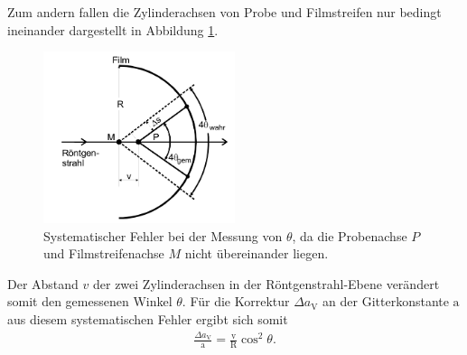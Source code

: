 Zum andern fallen die Zylinderachsen von Probe und Filmstreifen
nur bedingt ineinander dargestellt in Abbildung \ref{fig:error2}.

\begin{figure}
  \centering
  \includegraphics[width=0.5\textwidth]{Syst_error_2.PNG}
  \caption{Systematischer Fehler bei
  der Messung von $\theta$, da die Probenachse $P$
   und Filmstreifenachse $M$ nicht übereinander liegen.}
  \label{fig:error2}
\end{figure}
Der Abstand $v$ der zwei Zylinderachsen in der Röntgenstrahl-Ebene
verändert somit den gemessenen Winkel $\theta$.
Für die Korrektur $\Delta a_\mathrm{V}$ an der Gitterkonstante $\mathrm{a}$
aus diesem systematischen Fehler ergibt sich somit
\begin{align}
  \frac{\Delta a_\mathrm{V}}{\mathrm{a}}=\frac{\mathrm{v}}{\mathrm{R}} \cos^2 \theta. \label{eqn:sys2}
\end{align}
